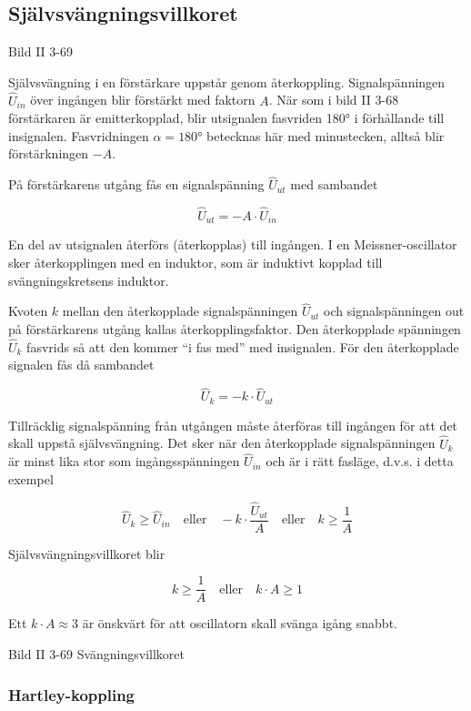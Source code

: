 \subsection{Självsvängningsvillkoret}

Bild II 3-69

Självsvängning i en förstärkare uppstår genom
återkoppling. Signalspänningen \(\hat{U}_{in}\) över ingången blir
förstärkt med faktorn \(A\). När som i bild II 3-68 förstärkaren är
emitterkopplad, blir utsignalen fasvriden 180° i förhållande till
insignalen. Fasvridningen \(\alpha=180°\) betecknas här med
minustecken, alltså blir förstärkningen \(-A\).

På förstärkarens utgång fås en signalspänning \(\hat{U}_{ut}\) med
sambandet

\[\hat{U}_{ut} = -A \cdot \hat{U}_{in}\]

En del av utsignalen återförs (återkopplas) till ingången. I en
Meissner-oscillator sker återkopplingen med en induktor, som är
induktivt kopplad till svängningskretsens induktor.

Kvoten \(k\) mellan den återkopplade signalspänningen \(\hat{U}_{ut}\) och
signalspänningen out på förstärkarens utgång kallas
återkopplingsfaktor. Den återkopplade spänningen \(\hat{U}_k\) fasvrids så
att den kommer ``i fas med'' med insignalen. För den återkopplade
signalen fås då sambandet

\[\hat{U}_k = -k \cdot \hat{U}_{ut}\]

Tillräcklig signalspänning från utgången måste återföras till ingången
för att det skall uppstå självsvängning. Det sker när den återkopplade
signalspänningen \(\hat{U}_k\) är minst lika stor som
ingångsspänningen \(\hat{U}_{in}\) och är i rätt fasläge, d.v.s. i
detta exempel

\[
\hat{U}_k \geq \hat{U}_{in}
\quad \text{eller} \quad
-k \cdot \frac{\hat{U}_{ut}}{A}
\quad \text{eller} \quad
k \geq \frac{1}{A}
\]

Självsvängningsvillkoret blir

\[
k \geq \frac{1}{A}
\quad \text{eller} \quad
k \cdot A \geq 1
\]

Ett \(k \cdot A \approx 3\) är önskvärt för att oscillatorn skall
svänga igång snabbt.

Bild II 3-69 Svängningsvillkoret

\subsubsection{Hartley-koppling}

